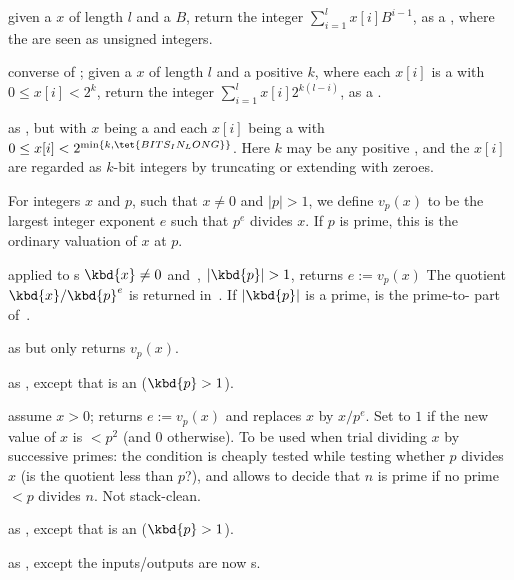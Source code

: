 given a  $x$ of length $l$ and a  $B$,
return the integer $\sum_{i = 1}^l x[i] B^{i-1}$, as a ,
where the  are seen as unsigned integers.

 converse of ;
given a  $x$ of length $l$ and a positive  $k$,
where each $x[i]$ is a  with $0\leq x[i] < 2^k$, return the
integer $\sum_{i = 1}^l x[i] 2^{k(l-i)}$, as a .

 as , but
with $x$ being a  and each $x[i]$ being a 
with $0\leq x[i] < 2^{\min\{k,\tet{BITS_IN_LONG}\}}$.  Here $k$ may be
any positive , and the $x[i]$ are regarded as $k$-bit
integers by truncating or extending with zeroes.

For integers $x$ and $p$, such that $x\neq 0$ and $|p| > 1$, we define
$v_p(x)$ to be the largest integer exponent $e$ such that $p^e$ divides $x$.
If $p$ is prime, this is the ordinary valuation of $x$ at $p$.

 applied to s
$\kbd{x}\neq 0$ and~, $|\kbd{p}| > 1$, returns $e := v_p(x)$
The quotient $\kbd{x}/\kbd{p}^e$ is returned in~. If
$|\kbd{p}|$ is a prime,  is the prime-to- part of~.

 as  but only returns
$v_p(x)$.

 as ,
except that  is an  ($\kbd{p} > 1$).

 assume $x > 0$;
returns $e := v_p(x)$ and replaces $x$ by $x / p^e$. Set  to $1$ if
the new value of $x$ is $ < p^2$ (and $0$ otherwise). To be used when trial
dividing $x$ by successive primes: the  condition is cheaply tested
while testing whether $p$ divides $x$ (is the quotient less than $p$?), and
allows to decide that $n$ is prime if no prime $< p$ divides $n$. Not
stack-clean.

 as ,
except that  is an  ($\kbd{p} > 1$).

 as ,
except the inputs/outputs are now s.

